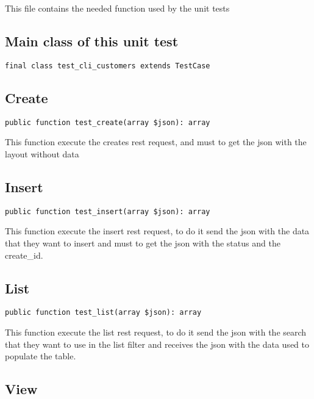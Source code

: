 \documentclass[a4paper]{book}
\begin{document}
This file contains the needed function used by the unit tests

\hypertarget{toc12}{}
\subsection{Main class of this unit test}

\begin{lstlisting}
final class test_cli_customers extends TestCase
\end{lstlisting}

\hypertarget{toc13}{}
\subsection{Create}

\begin{lstlisting}
public function test_create(array $json): array
\end{lstlisting}

This function execute the creates rest request, and must to get the
json with the layout without data

\hypertarget{toc14}{}
\subsection{Insert}

\begin{lstlisting}
public function test_insert(array $json): array
\end{lstlisting}

This function execute the insert rest request, to do it send the json with
the data that they want to insert and must to get the json with the status
and the create\_id.

\hypertarget{toc15}{}
\subsection{List}

\begin{lstlisting}
public function test_list(array $json): array
\end{lstlisting}

This function execute the list rest request, to do it send the json with
the search that they want to use in the list filter and receives the json
with the data used to populate the table.

\hypertarget{toc16}{}
\subsection{View}
\end{document}
